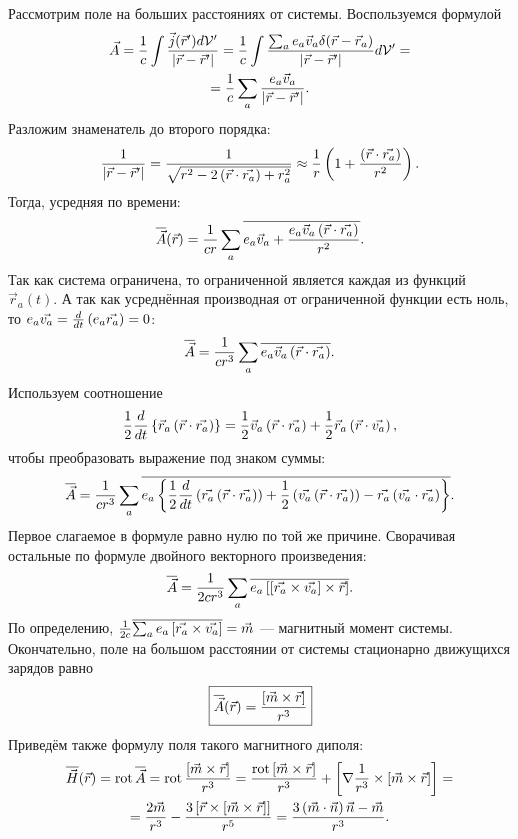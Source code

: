     Рассмотрим поле на больших расстояниях от системы. Воспользуемся формулой
    \begin{gather*}
        \vec{A} = \frac 1c \int \frac{\vec{j}(\vec{r}')d\mathcal{V}'}{\left|{\vec{r} - \vec{r}'}\right|} = 
        \frac 1c \int \frac{\sum_ae_a\vec{v}_a\delta(\vec{r} - \vec{r}_a)}{\left|{\vec{r} - \vec{r}'}\right|}d\mathcal{V}' = \\ =
        \frac 1c \sum_a \frac{e_a\vec{v}_a}{\left|{\vec{r} - \vec{r}'}\right|}.
    \end{gather*}
    Разложим знаменатель до второго порядка:
    \[
        \frac{1}{\left|{\vec{r} - \vec{r}'}\right|} = \frac{1}{\sqrt{r^2 -2\left({\vec{r}\cdot\vec{r_a}}\right) + r_a^2}} \approx \frac 1r \left({1 + \frac{\left({\vec{r}\cdot\vec{r_a}}\right)}{r^2}}\right).
    \]
    Тогда, усредняя по времени:
    \begin{gather*}
        \overline{\vec{A}}(\vec{r}) = \frac{1}{cr}\sum_a\overline{e_a\vec{v}_a + \frac{e_a\vec{v}_a \left({\vec{r}\cdot\vec{r_a}}\right)}{r^2}}.
    \end{gather*}
    Так как система ограничена, то ограниченной является каждая из функций $\vec{r}_a(t)$. А так как усреднённая производная от 
    ограниченной функции есть ноль, то $e_a\vec{v_a} = \frac{d}{dt}\left({e_a\vec{r_a}}\right) = 0$:
    \[
        \overline{\vec{A}} = \frac{1}{cr^3}\sum_a\overline{e_a\vec{v}_a\left({\vec{r}\cdot\vec{r_a}}\right)}.
    \]
    Используем соотношение
    \[
        \frac 12 \frac{d}{dt}\left\{{\vec{r}_a \left({\vec{r}\cdot\vec{r_a}}\right)}\right\} = \frac 12 \vec{v}_a \left({\vec{r}\cdot\vec{r_a}}\right) + \frac 12 \vec{r}_a\left({\vec{r}\cdot\vec{v_a}}\right),
    \]
    чтобы преобразовать выражение под знаком суммы:
    \[
        \overline{\vec{A}} = \frac{1}{cr^3}\sum_a\overline{e_a\left\{{\frac 12 \frac{d}{dt} 
        \left({\vec{r_a}\left({\vec{r}\cdot\vec{r_a}}\right)}\right) + \frac 12 \left({\vec{v_a}\left({\vec{r}\cdot\vec{r_a}}\right)}\right) - \vec{r_a}\left({\vec{v_a}\cdot\vec{r_a}}\right)}\right\}}.
    \]
    Первое слагаемое в формуле равно нулю по той же причине. Сворачивая остальные по формуле двойного векторного произведения:
    \[
        \overline{\vec{A}} = \frac{1}{2cr^3}\sum_a\overline{e_a\left[{\left[{\vec{r_a}\times\vec{v_a}}\right] \times \vec{r}}\right]}.
    \]
    По определению, $\frac{1}{2c} \overline{\sum_ae_a \left[{\vec{r_a}\times\vec{v_a}}\right]} = \vec{m}$ --- магнитный момент системы.
    Окончательно, поле на большом расстоянии от системы стационарно движущихся зарядов равно
    \[
        \boxed{\overline{\vec{A}}(\vec{r}) = \frac{\left[{\vec{m}\times\vec{r}}\right]}{r^3}}
    \]
    Приведём также формулу поля такого магнитного диполя:
    \begin{gather*}
        \overline{\vec{H}}(\vec{r}) = \operatorname{rot}\overline{\vec{A}} = \operatorname{rot}\frac{\left[{\vec{m}\times\vec{r}}\right]}{r^3} = \frac{\operatorname{rot}\left[{\vec{m}\times\vec{r}}\right]}{r^3} + 
        \left[{\nabla\frac{1}{r^3} \times \left[{\vec{m}\times\vec{r}}\right]}\right] = \\ =
        \frac{2\vec{m}}{r^3} - \frac{3\left[{\vec{r} \times \left[{\vec{m}\times\vec{r}}\right]}\right]}{r^5} = \frac{3\left({\vec{m}\cdot\vec{n}}\right)\vec{n} - \vec{m}}{r^3}.
    \end{gather*}